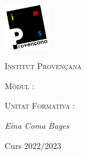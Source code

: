 \begin{titlepage}
	\centering
	\includegraphics*[width=0.15\textwidth]{provencana_color.pdf}
	\par\vspace{0.5cm}

	{\scshape\Large Institut Provençana \par}

	\vspace{1cm}

	{\itshape\Large \acttipus \par}
	{\bfseries\LARGE \actnom \par}
	
	\vspace{1cm}
	
	{\scshape\large Mòdul \modulnum: \par}
	{\scshape\Large \modulnom \par}

	\vspace{1cm}
	
	{\scshape\normalsize Unitat Formativa \ufnum: \par}
	{\scshape\large \ufnom \par}

	\vfill
	{\Large\itshape Eina Coma Bages\par}
	\vfill

	Curs 2022/2023
\end{titlepage}